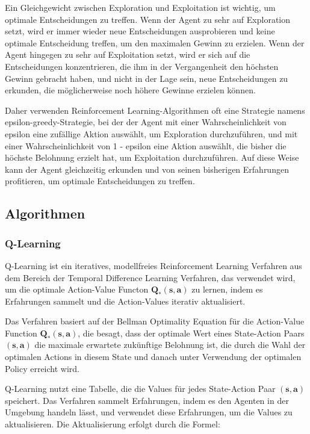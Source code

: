 \begin{enumerate}
    Ein Gleichgewicht zwischen Exploration und Exploitation ist wichtig, um optimale Entscheidungen zu treffen. Wenn der Agent zu sehr auf Exploration setzt, wird er immer wieder neue Entscheidungen ausprobieren und keine optimale Entscheidung treffen, um den maximalen Gewinn zu erzielen. Wenn der Agent hingegen zu sehr auf Exploitation setzt, wird er sich auf die Entscheidungen konzentrieren, die ihm in der Vergangenheit den höchsten Gewinn gebracht haben, und nicht in der Lage sein, neue Entscheidungen zu erkunden, die möglicherweise noch höhere Gewinne erzielen können.
    
    Daher verwenden Reinforcement Learning-Algorithmen oft eine Strategie namens epsilon-greedy-Strategie, bei der der Agent mit einer Wahrscheinlichkeit von epsilon eine zufällige Aktion auswählt, um Exploration durchzuführen, und mit einer Wahrscheinlichkeit von 1 - epsilon eine Aktion auswählt, die bisher die höchste Belohnung erzielt hat, um Exploitation durchzuführen. Auf diese Weise kann der Agent gleichzeitig erkunden und von seinen bisherigen Erfahrungen profitieren, um optimale Entscheidungen zu treffen.

\end{enumerate}

\subsection{Algorithmen}

\subsubsection{Q-Learning}

Q-Learning ist ein iteratives, modellfreies Reinforcement Learning Verfahren aus dem Bereich der Temporal Difference Learning Verfahren, das verwendet wird, um die optimale Action-Value Functon $\bm{Q_{*}(s,a)}$ zu lernen, indem es Erfahrungen sammelt und die Action-Values iterativ aktualisiert.

Das Verfahren basiert auf der Bellman Optimality Equation für die Action-Value Function $\bm{Q_{*}(s,a)}$, die besagt, dass der optimale Wert eines State-Action Paars $\bm{(s,a)}$ die maximale erwartete zukünftige Belohnung ist, die durch die Wahl der optimalen Actions in diesem State und danach unter Verwendung der optimalen Policy erreicht wird.

Q-Learning nutzt eine Tabelle, die die Values für jedes State-Action Paar $\bm{(s,a)}$ speichert. Das Verfahren sammelt Erfahrungen, indem es den Agenten in der Umgebung handeln lässt, und verwendet diese Erfahrungen, um die Values zu aktualisieren. Die Aktualisierung erfolgt durch die Formel:


